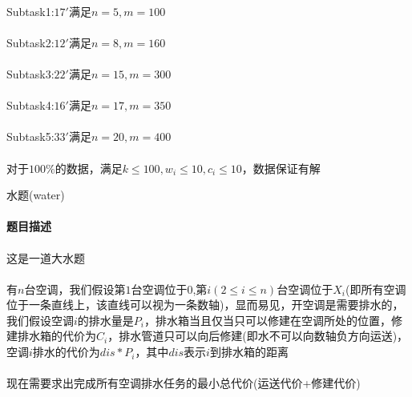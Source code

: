 \documentclass[UTF8]{ctexart}
\begin{document}
\paragraph{}Subtask1:$17'$满足$n=5,m=100$
\paragraph{}Subtask2:$12'$满足$n=8,m=160$
\paragraph{}Subtask3:$22'$满足$n=15,m=300$
\paragraph{}Subtask4:$16'$满足$n=17,m=350$
\paragraph{}Subtask5:$33'$满足$n=20,m=400$
\paragraph{}对于$100\%$的数据，满足$k\leq 100,w_i\leq 10,c_i\leq 10$，数据保证有解

\clearpage

\begin{center}
    \large{水题(water)}
\end{center}
\paragraph{题目描述}
\paragraph{}这是一道大水题
\paragraph{}有$n$台空调，我们假设第$1$台空调位于$0$,第$i(2\leq i\leq n)$台空调位于$X_i$(即所有空调位于一条直线上，该直线可以视为一条数轴)，显而易见，开空调是需要排水的，我们假设空调$i$的排水量是$P_i$，排水箱当且仅当只可以修建在空调所处的位置，修建排水箱的代价为$C_i$，排水管道只可以向后修建(即水不可以向数轴负方向运送)，空调$i$排水的代价为$dis*P_i$，其中$dis$表示$i$到排水箱的距离
\paragraph{}现在需要求出完成所有空调排水任务的最小总代价(运送代价+修建代价)
\end{document}
